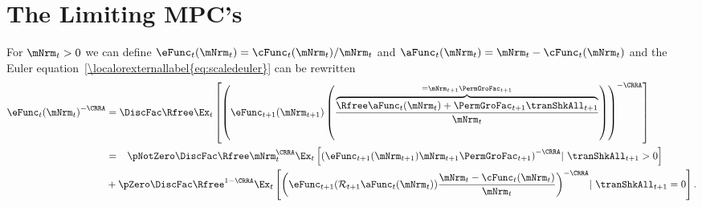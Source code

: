 \documentclass[\econtexRoot/BufferStockTheory]{subfiles}
\begin{document}
\hypertarget{The-Limiting-MPCs}{}
\section{The Limiting MPC's}\label{sec:MPCLimits}

For $\mNrm_{t}>0$ we can define $\eFunc_{t}(\mNrm_{t})=\cFunc_{t}(\mNrm_{t})/\mNrm_{t}$ and $\aFunc_{t}(\mNrm_{t})=\mNrm_{t}-\cFunc_{t}(\mNrm_{t})$ and the Euler equation~\eqref{\localorexternallabel{eq:scaledeuler}} can be rewritten
\begin{equation}\begin{gathered}\begin{aligned}
 \eFunc_{t}{(\mNrm_{t})}^{-\CRRA}  & = \DiscFac \Rfree \Ex_{t}\left[{\left(\eFunc_{t+1}({\mNrm}_{t+1})\left(\frac{\overbrace{\Rfree \aFunc_{t}(\mNrm_{t})+{\PermGroFac}_{t+1}{\tranShkAll}_{t+1}}^{=\mNrm_{t+1}\PermGroFac_{t+1}}}{\mNrm_{t}}\right)\right)}^{-\CRRA }\right] \label{eq:eFuncEuler}
\\  & = \phantom{ + }\pNotZero \DiscFac \Rfree \mNrm_{t}^{\CRRA} \Ex_{t}\left[ {\left(\eFunc_{t+1}(\mNrm_{t+1}) \mNrm_{t+1}\PermGroFac_{t+1}\right)}^{-\CRRA} |~ \tranShkAll_{t+1}>0 \right] \notag
\\ &  + \pZero  \DiscFac \Rfree^{1-\CRRA} \Ex_{t}\left[{\left(\eFunc_{t+1}(\mathcal{R}_{t+1}\aFunc_{t}(\mNrm_{t}))\frac{\mNrm_t-\cFunc_{t}(\mNrm_{t})}{\mNrm_{t}}\right)}^{-\CRRA} |~ \tranShkAll_{t+1} = 0 \right]   .
\end{aligned}\end{gathered}\end{equation}
\end{document}
